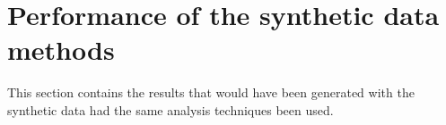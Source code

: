 \section{Performance of the synthetic data methods}
\label{sec:results}

This section contains the results that would have been generated with the synthetic data had the same analysis techniques been used.










